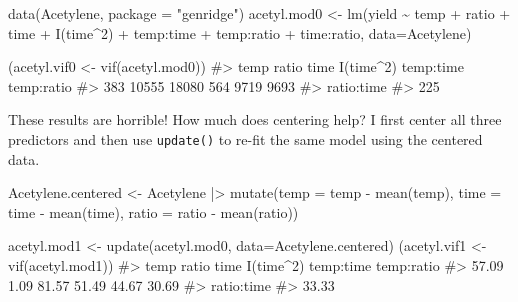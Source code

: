 \documentclass[
  letterpaper,
  10pt,
  krantz2]{krantz}
\makeatletter
\newenvironment{Shaded}{\begin{snugshade}}{\end{snugshade}}
\newcommand{\AttributeTok}[1]{\textcolor[rgb]{0.40,0.45,0.13}{#1}}
\newcommand{\CommentTok}[1]{\textcolor[rgb]{0.37,0.37,0.37}{#1}}
\newcommand{\DecValTok}[1]{\textcolor[rgb]{0.68,0.00,0.00}{#1}}
\newcommand{\FunctionTok}[1]{\textcolor[rgb]{0.28,0.35,0.67}{#1}}
\newcommand{\NormalTok}[1]{\textcolor[rgb]{0.00,0.23,0.31}{#1}}
\newcommand{\OtherTok}[1]{\textcolor[rgb]{0.00,0.23,0.31}{#1}}
\newcommand{\SpecialCharTok}[1]{\textcolor[rgb]{0.37,0.37,0.37}{#1}}
\newcommand{\StringTok}[1]{\textcolor[rgb]{0.13,0.47,0.30}{#1}}
\newenvironment{kframe}{%
  \medskip{}
  \setlength{\fboxsep}{.8em}
  \def\at@end@of@kframe{}%
  \ifinner\ifhmode%
  \def\at@end@of@kframe{\end{minipage}}%
  \begin{minipage}{\columnwidth}%
  \fi\fi%
  \def\FrameCommand##1{\hskip\@totalleftmargin \hskip-\fboxsep
  \colorbox{shadecolor}{##1}\hskip-\fboxsep
      \hskip-\linewidth \hskip-\@totalleftmargin \hskip\columnwidth}%
  \MakeFramed {\advance\hsize-\width
    \@totalleftmargin\z@ \linewidth\hsize
    \@setminipage}}%
{\par\unskip\endMakeFramed%
  \at@end@of@kframe}
\renewenvironment{Shaded}{\begin{kframe}}{\end{kframe}}
\makeatother
\begin{document}
\begin{Shaded}
\begin{Highlighting}[]
\FunctionTok{data}\NormalTok{(Acetylene, }\AttributeTok{package =} \StringTok{"genridge"}\NormalTok{)}
\NormalTok{acetyl.mod0 }\OtherTok{\textless{}{-}} \FunctionTok{lm}\NormalTok{(yield }\SpecialCharTok{\textasciitilde{}}\NormalTok{ temp }\SpecialCharTok{+}\NormalTok{ ratio }\SpecialCharTok{+}\NormalTok{ time }\SpecialCharTok{+} \FunctionTok{I}\NormalTok{(time}\SpecialCharTok{\^{}}\DecValTok{2}\NormalTok{) }\SpecialCharTok{+} 
\NormalTok{                          temp}\SpecialCharTok{:}\NormalTok{time }\SpecialCharTok{+}\NormalTok{ temp}\SpecialCharTok{:}\NormalTok{ratio }\SpecialCharTok{+}\NormalTok{ time}\SpecialCharTok{:}\NormalTok{ratio,}
                  \AttributeTok{data=}\NormalTok{Acetylene)}

\NormalTok{(acetyl.vif0 }\OtherTok{\textless{}{-}} \FunctionTok{vif}\NormalTok{(acetyl.mod0))}
\CommentTok{\#\textgreater{}       temp      ratio       time  I(time\^{}2)  temp:time temp:ratio }
\CommentTok{\#\textgreater{}        383      10555      18080        564       9719       9693 }
\CommentTok{\#\textgreater{} ratio:time }
\CommentTok{\#\textgreater{}        225}
\end{Highlighting}
\end{Shaded}

These results are horrible! How much does centering help? I first center
all three predictors and then use \texttt{update()} to re-fit the same
model using the centered data.

\begin{Shaded}
\begin{Highlighting}[]
\NormalTok{Acetylene.centered }\OtherTok{\textless{}{-}}
\NormalTok{  Acetylene }\SpecialCharTok{|\textgreater{}}
  \FunctionTok{mutate}\NormalTok{(}\AttributeTok{temp =}\NormalTok{ temp }\SpecialCharTok{{-}} \FunctionTok{mean}\NormalTok{(temp),}
         \AttributeTok{time =}\NormalTok{ time }\SpecialCharTok{{-}} \FunctionTok{mean}\NormalTok{(time),}
         \AttributeTok{ratio =}\NormalTok{ ratio }\SpecialCharTok{{-}} \FunctionTok{mean}\NormalTok{(ratio))}

\NormalTok{acetyl.mod1 }\OtherTok{\textless{}{-}} \FunctionTok{update}\NormalTok{(acetyl.mod0, }\AttributeTok{data=}\NormalTok{Acetylene.centered)}
\NormalTok{(acetyl.vif1 }\OtherTok{\textless{}{-}} \FunctionTok{vif}\NormalTok{(acetyl.mod1))}
\CommentTok{\#\textgreater{}       temp      ratio       time  I(time\^{}2)  temp:time temp:ratio }
\CommentTok{\#\textgreater{}      57.09       1.09      81.57      51.49      44.67      30.69 }
\CommentTok{\#\textgreater{} ratio:time }
\CommentTok{\#\textgreater{}      33.33}
\end{Highlighting}
\end{Shaded}
\end{document}
